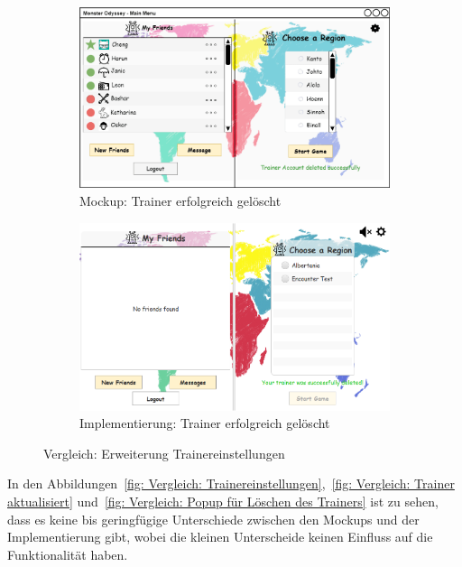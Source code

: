 \begin{figure}[H]
    \centering
    \begin{subfigure}[b]{0.4\textwidth}
        \includegraphics[width=\textwidth]{images/mockups/Bonusfeatures/TrainerSettings/TrainerAccountDeleted.png}
        \caption{Mockup: Trainer erfolgreich gelöscht}
        \label{fig: Mockup: Trainer erfolgreich gelöscht}
    \end{subfigure}
    \hfill
    \begin{subfigure}[b]{0.4\textwidth}
        \includegraphics[width=\textwidth]{images/implementation/Bonusfeatures/TrainerSettings/Trainerdeleted.PNG}
        \caption{Implementierung: Trainer erfolgreich gelöscht}
        \label{fig: Implementierung: Trainer erfolgreich gelöscht}
    \end{subfigure}
    \caption{Vergleich: Erweiterung Trainereinstellungen}
    \label{fig: Vergleich: Erweiterung Trainereinstellungen}
\end{figure}
In den Abbildungen~\ref{fig: Vergleich: Trainereinstellungen},~\ref{fig: Vergleich: Trainer aktualisiert} und~\ref{fig: Vergleich: Popup für Löschen des Trainers} ist zu sehen, dass es keine bis geringfügige Unterschiede zwischen den Mockups und der Implementierung gibt, wobei die kleinen Unterscheide keinen Einfluss auf die Funktionalität haben.
